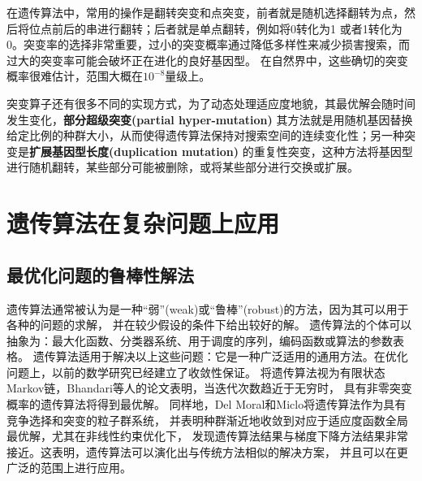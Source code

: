 \documentclass[12pt, a4paper, oneside]{ctexart}
\numberwithin{equation}{section}  %
\begin{document}
在遗传算法中，常用的操作是翻转突变和点突变，前者就是随机选择翻转为点，然后将位点前后的串进行翻转；后者就是单点翻转，例如将0转化为1
或者1转化为0。突变率的选择非常重要，过小的突变概率通过降低多样性来减少损害搜索，而过大的突变率可能会破坏正在进化的良好基因型。
在自然界中，这些确切的突变概率很难估计，范围大概在$10^{-8}$量级上。

突变算子还有很多不同的实现方式，为了动态处理适应度地貌，其最优解会随时间发生变化，\textbf{部分超级突变(partial hyper-mutation)}\cite{bib-Grefenstette1992}
其方法就是用随机基因替换给定比例的种群大小，从而使得遗传算法保持对搜索空间的连续变化性；另一种突变是\textbf{扩展基因型长度(duplication mutation)}\cite{bib-Lindgren1992}
的重复性突变，这种方法将基因型进行随机翻转，某些部分可能被删除，或将某些部分进行交换或扩展。

\section{遗传算法在复杂问题上应用}
\subsection{最优化问题的鲁棒性解法}
遗传算法通常被认为是一种“弱”(weak)或“鲁棒”(robust)的方法\cite{bib-Whitley1994}，因为其可以用于各种的问题的求解，
并在较少假设的条件下给出较好的解。
遗传算法的个体可以抽象为：最大化函数、分类器系统、用于调度的序列，编码函数或算法的参数表格。
遗传算法适用于解决以上这些问题：它是一种广泛适用的通用方法。在优化问题上，以前的数学研究已经建立了收敛性保证。
将遗传算法视为有限状态Markov链，Bhandari等人的论文\cite{bib-Bhandari1996}表明，当迭代次数趋近于无穷时，
具有非零突变概率的遗传算法将得到最优解。
同样地，Del Moral和Miclo\cite{bib-Moral2001}将遗传算法作为具有竞争选择和突变的粒子群系统，
并表明种群渐近地收敛到对应于适应度函数全局最优解，尤其在非线性约束优化下\cite{bib-Homaifar1994}，
发现遗传算法结果与梯度下降方法结果非常接近。这表明，遗传算法可以演化出与传统方法相似的解决方案，
并且可以在更广泛的范围上进行应用。
\end{document}
